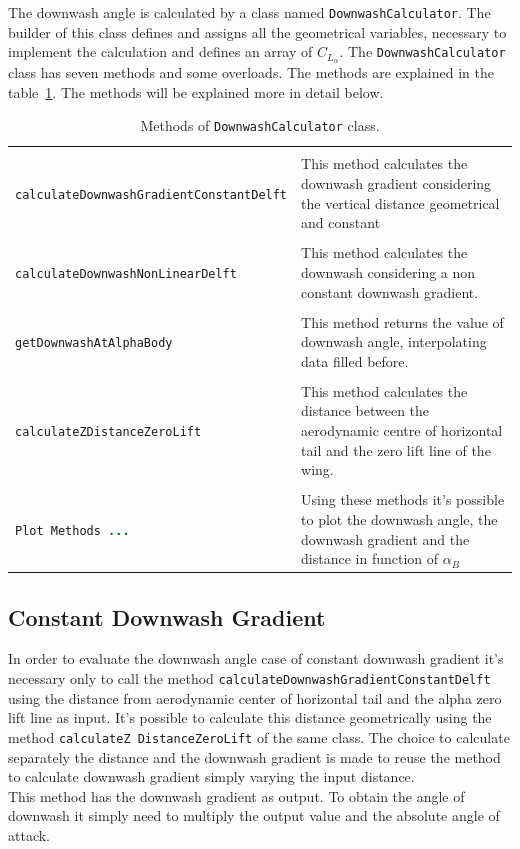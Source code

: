 The downwash angle is calculated by a class named \texttt{DownwashCalculator}. The builder of this class defines and assigns all the geometrical variables, necessary to implement the calculation and defines an array of $C_{L_{\alpha}}$. The  \texttt{DownwashCalculator} class has seven methods and some overloads. The methods are explained in the table~\ref{table:Table1}. The methods will be explained more in detail below.

\begin{table}[H]
\begin{tabular}{p{7cm}p{7.5cm}}
\toprule
 \\[0.1	cm] 
\lstinline[language=Java]!calculateDownwashGradientConstantDelft! & This method calculates the downwash gradient  considering the vertical distance geometrical and constant\\ \hline \\[0.1	cm] 
\lstinline[language=Java]!calculateDownwashNonLinearDelft! &This method calculates the downwash considering a non constant downwash gradient.  \\ \hline \\ [0.1cm]
\lstinline[language=Java]!getDownwashAtAlphaBody! & This method returns the value of downwash angle, interpolating data filled before.\\ \hline \\[0.1cm]
\lstinline[language=Java]!calculateZDistanceZeroLift!	& This method calculates the distance between the aerodynamic centre of horizontal tail and the zero lift line of the wing. \\ \hline \\[0.1cm]
\lstinline[language=Java]!Plot Methods ...! & Using these methods it's possible to plot the downwash angle, the downwash gradient and the distance in function of $\alpha_{B}$ \\
\bottomrule
\end{tabular}
\caption{Methods of \texttt{DownwashCalculator} class.}
\label{table:Table1}
\end{table}


\subsection{Constant Downwash Gradient}
In order to evaluate the downwash angle case of constant downwash gradient it's necessary only to call the method \texttt{calculateDownwashGradientConstantDelft} using the distance from aerodynamic center of horizontal tail and the alpha zero lift line as input. It's possible to calculate this distance geometrically using the method \texttt{calculateZ DistanceZeroLift} of the same class. The choice to calculate separately the distance and the downwash gradient is made to reuse the method to calculate downwash gradient simply varying the input distance. \\ 
This method has the downwash gradient as output. To obtain the angle of downwash it simply need to multiply the output value and the absolute angle of attack. 

